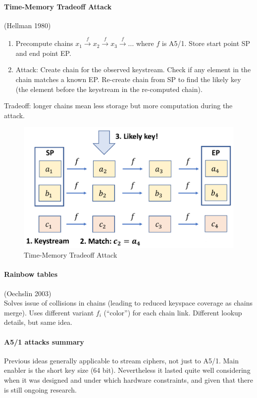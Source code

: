 \paragraph{Time-Memory Tradeoff Attack} (Hellman 1980)
\begin{enumerate}
	\item Precompute chains $x_1 \overset{f}{\rightarrow} x_2 \overset{f}{\rightarrow} x_3 \overset{f}{\rightarrow} ...$ where $f$ is A5/1.
	Store start point SP and end point EP.
	\item Attack: Create chain for the observed keystream.
	Check if any element in the chain matches a known EP.
	Re-create chain from SP to find the likely key (the element before the keystream in the re-computed chain).
\end{enumerate}
Tradeoff: longer chains mean less storage but more computation during the attack.

\begin{figure}
	\centering
	\includegraphics[scale=0.3]{images/10-2g-tmto.png}
	\caption{Time-Memory Tradeoff Attack}
	\label{fig:2g-tmto}
\end{figure}

\paragraph{Rainbow tables} (Oechslin 2003)
\\
Solves issue of collisions in chains (leading to reduced keyspace coverage as chains merge).
Uses different variant $f_i$ (``color'') for each chain link.
Different lookup details, but same idea.

\paragraph{A5/1 attacks summary}
Previous ideas generally applicable to stream ciphers, not just to A5/1.
Main enabler is the short key size (64 bit).
Nevertheless it lasted quite well considering when it was designed and under which hardware constraints, and given that there is still ongoing research.

